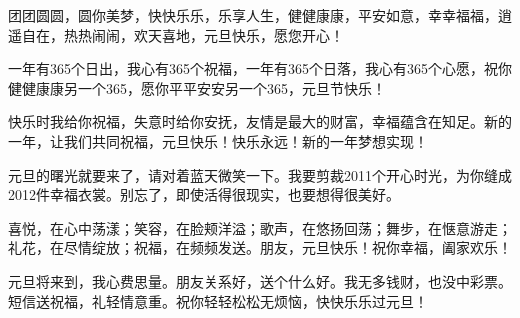 {团团圆圆，圆你美梦，快快乐乐，乐享人生，健健康康，平安如意，幸幸福福，逍遥自在，热热闹闹，欢天喜地，元旦快乐，愿您开心！

一年有365个日出，我心有365个祝福，一年有365个日落，我心有365个心愿，祝你健健康康另一个365，愿你平平安安另一个365，元旦节快乐！

快乐时我给你祝福，失意时给你安抚，友情是最大的财富，幸福蕴含在知足。新的一年，让我们共同祝福，元旦快乐！快乐永远！新的一年梦想实现！

元旦的曙光就要来了，请对着蓝天微笑一下。我要剪裁2011个开心时光，为你缝成2012件幸福衣裳。别忘了，即使活得很现实，也要想得很美好。

喜悦，在心中荡漾；笑容，在脸颊洋溢；歌声，在悠扬回荡；舞步，在惬意游走；礼花，在尽情绽放；祝福，在频频发送。朋友，元旦快乐！祝你幸福，阖家欢乐！

元旦将来到，我心费思量。朋友关系好，送个什么好。我无多钱财，也没中彩票。短信送祝福，礼轻情意重。祝你轻轻松松无烦恼，快快乐乐过元旦！


}



\makecnabstract